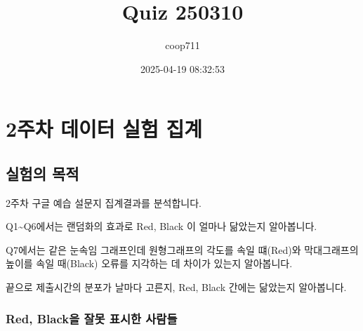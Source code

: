 \documentclass[
]{article}
\title{Quiz 250310}
\author{coop711}
\date{2025-04-19 08:32:53}
\begin{document}
\maketitle

\section{2주차 데이터 실험
집계}\label{uxc8fcuxcc28-uxb370uxc774uxd130-uxc2e4uxd5d8-uxc9d1uxacc4}

\subsection{실험의 목적}\label{uxc2e4uxd5d8uxc758-uxbaa9uxc801}

2주차 구글 예습 설문지 집계결과를 분석합니다.

Q1\textasciitilde Q6에서는 랜덤화의 효과로 Red, Black 이 얼마나 닮았는지
알아봅니다.

Q7에서는 같은 눈속임 그래프인데 원형그래프의 각도를 속일 떄(Red)와
막대그래프의 높이를 속일 때(Black) 오류를 지각하는 데 차이가 있는지
알아봅니다.

끝으로 제출시간의 분포가 날마다 고른지, Red, Black 간에는 닮았는지
알아봅니다.

\subsubsection{Red, Black을 잘못 표시한
사람들}\label{red-blackuxc744-uxc798uxbabb-uxd45cuxc2dcuxd55c-uxc0acuxb78cuxb4e4}
\end{document}
